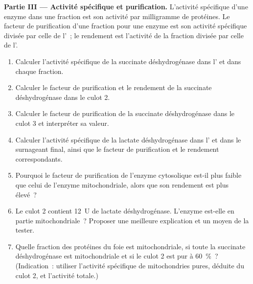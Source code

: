 \begin{problem}
\medskip
\noindent\textbf{Partie III --- Activité spécifique et purification.}
L'activité spécifique d'une enzyme dans une fraction est son activité
par milligramme de protéines. Le facteur de purification d'une fraction
pour une enzyme est son activité spécifique divisée par celle de
l'~; le rendement est l'activité de la fraction divisée par
celle de l'.
\begin{enumerate}[resume]
  \item Calculer l'activité spécifique de la succinate déshydrogénase
        dans l' et dans chaque fraction.
  \item Calculer le facteur de purification et le rendement de la
        succinate déshydrogénase dans le culot 2.
  \item Calculer le facteur de purification de la succinate
        déshydrogénase dans le culot 3 et interpréter sa valeur.
  \item Calculer l'activité spécifique de la lactate déshydrogénase dans
        l' et dans le surnageant final, ainsi que le facteur de
        purification et le rendement correspondants.
  \item Pourquoi le facteur de purification de l'enzyme cytosolique
        est-il plus faible que celui de l'enzyme mitochondriale, alors
        que son rendement est plus élevé~?
  \item Le culot 2 contient \qty{12}{U} de lactate déshydrogénase.
        L'enzyme est-elle en partie mitochondriale~? Proposer une
        meilleure explication et un moyen de la tester.
  \item Quelle fraction des protéines du foie est mitochondriale, si
        toute la succinate déshydrogénase est mitochondriale et si le
        culot 2 est pur à \qty{60}{\%}~? (Indication~: utiliser
        l'activité spécifique de mitochondries pures, déduite du culot
        2, et l'activité totale.)
\end{enumerate}


\end{problem}
